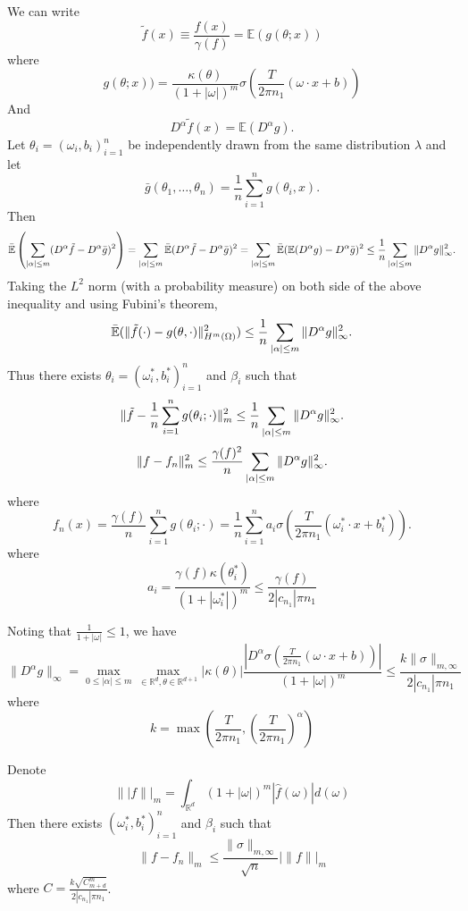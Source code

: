 We can write
\begin{equation}
\tilde f(x)\equiv\frac{f(x)}{\gamma(f)}
=\mathbb{E}(g(\theta; x))
\end{equation}
where
\begin{equation}
\label{gx}
g(\theta; x))
=\frac{\kappa(\theta)}{(1+|\omega|)^m}\sigma(\frac{T}{2\pi n_1}(\omega\cdot x+b))
\end{equation}
And 
\begin{equation}
D^\alpha \tilde f(x)=\mathbb{E}(D^\alpha g).
\end{equation}
Let $\theta_i=(\omega_i,b_i)_{i=1}^n$ be independently drawn from the same distribution $\lambda$ and let 
$$
\bar g(\theta_1,\ldots,\theta_n)
=\frac{1}{n} \sum_{i=1}^ng(\theta_i, x).
$$
Then
$$
\bar{\mathbb E} \left(\sum_{|\alpha|\le m}(D^\alpha \tilde f-D^\alpha \bar
g)^2\right) 
=\sum_{|\alpha|\le m}\bar{\mathbb E} (D^\alpha \tilde f-D^\alpha \bar g)^2
=\sum_{|\alpha|\le m}\bar{\mathbb E} (\mathbb E(D^\alpha g)-D^\alpha \bar g)^2 
\le{1\over n}\sum_{|\alpha|\le m}\|D^\alpha g\|_\infty^2.
$$
Taking the $L^2$ norm (with a probability measure) on both side of the above inequality
and using Fubini's theorem,
\begin{equation}
\mathbb{\bar{\mathbb{E}}}(\|\tilde f(\cdot)-g(\theta,\cdot)\|^2_{H^m(\Omega)})
\le{1\over n}\sum_{|\alpha|\le m}\|D^\alpha g\|_\infty^2.
\end{equation}
Thus there exists $\theta_i=(\omega_i^*,b_i^*)_{i=1}^n$ and $\beta_i$ such that 
$$
\|\tilde f-\frac{1}{n}\sum_{i=1}^{n} g(\theta_i; \cdot)\|_m^2
\le{1\over n}\sum_{|\alpha|\le m}\|D^\alpha g\|_\infty^2.
$$
$$
\|f-f_n\|_m^2
\le{\gamma(f)^2\over n}
\sum_{|\alpha|\le m}\|D^\alpha g\|_\infty^2.
$$
where
$$
f_n(x)=\frac{\gamma(f)}{n}\sum_{i=1}^{n} g(\theta_i; \cdot)=\frac{1}{n} \sum_{i=1}^n a_i\sigma(\frac{T}{2\pi n_1}(\omega_i^*\cdot x+b_i^*)).
$$
where 
$$
a_i= \frac{\gamma(f)\kappa(\theta_i^*)}{(1+|\omega_i^*|)^m} \le \frac{\gamma(f)}{2|c_{n_1}|\pi n_1}
$$

Noting that $\frac{1}{1+|\omega|}\le1$, we have
$$
\|D^\alpha g\|_{\infty}=
\max_{0\le|\alpha|\le m}\max_{\in\mathbb{R}^d,\theta\in\mathbb{R}^{d+1}}|\kappa(\theta)|\frac{|D^\alpha\sigma( \frac{T}{2\pi n_1}(\omega\cdot x+b) )|}{(1+|\omega|)^m}\le \frac{k\|\sigma\|_{m,\infty}}{2|c_{n_1}|\pi n_1}
$$
where
$$
k = \max(\frac{T}{2\pi n_1},(\frac{T}{2\pi n_1})^\alpha)
$$


Denote
$$
\||f\||_{m} = \int_{\mathbb{R}^d}(1+|\omega|)^{m} |\hat{f}(\omega)|d(\omega)
$$
Then there exists $(\omega_i^*,b_i^*)_{i=1}^n$ and $\beta_i$ such that 
$$
\|f-f_n\|_m
\le\frac{\|\sigma\|_{m,\infty}}{\sqrt{n}}|\|f\||_{m} 
$$
where $C=\frac{k\sqrt{C_{m+d}^m}}{2|c_{n_1}|\pi n_1} $.


